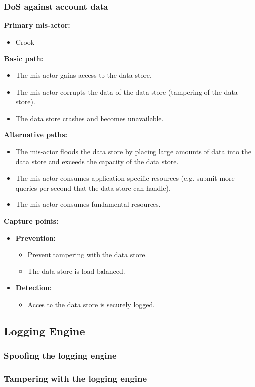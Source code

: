 \documentclass[a4paper,11pt]{report}
\begin{document}
\subsubsection{DoS against account data}
\textbf{Primary mis-actor:}
\begin{itemize}
\item Crook
\end{itemize}
\textbf{Basic path:}
\begin{itemize}
\item The mis-actor gains access to the data store.
\item The mis-actor corrupts the data of the data store (tampering of the data store).
\item The data store crashes and becomes unavailable.
\end{itemize}
\textbf{Alternative paths:}
\begin{itemize}
\item The mis-actor floods the data store by placing large amounts of data into the data store and exceeds the 
capacity of the data store.
\item The mis-actor consumes application-specific resources (e.g. submit more queries per second that the data 
store can handle).
\item The mis-actor consumes fundamental resources.
\end{itemize}
\textbf{Capture points:}
\begin{itemize}
\item \textbf{Prevention:}
\begin{itemize}
\item Prevent tampering with the data store.
\item The data store is load-balanced.
\end{itemize}
\item \textbf{Detection:}
\begin{itemize}
\item Acces to the data store is securely logged.
\end{itemize}
\end{itemize}
\subsection{Logging Engine}
\subsubsection{Spoofing the logging engine}
\subsubsection{Tampering with the logging engine}
\end{document}
